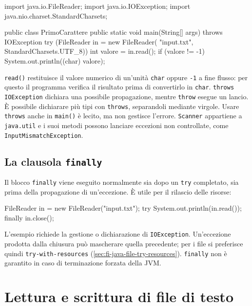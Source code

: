 \begin{unipdcode}[language=Java]
import java.io.FileReader;
import java.io.IOException;
import java.nio.charset.StandardCharsets;

public class PrimoCarattere {
    public static void main(String[] args) throws IOException {
        try (FileReader in = new FileReader(
                "input.txt", StandardCharsets.UTF_8)) {
            int valore = in.read();
            if (valore != -1) {
                System.out.println((char) valore);
            }
        }
    }
}
\end{unipdcode}

\texttt{read()} restituisce il valore numerico di un'unità
\texttt{char} oppure \texttt{-1} a fine flusso: per questo il
programma verifica il risultato prima di convertirlo in
\texttt{char}. \texttt{throws IOException} dichiara una possibile
propagazione, mentre \texttt{throw} esegue un lancio. È possibile dichiarare
più tipi con \texttt{throws}, separandoli mediante virgole.
Usare \texttt{throws} anche in \texttt{main()} è lecito,
ma non gestisce l'errore.
\texttt{Scanner} appartiene a \texttt{java.util} e i suoi metodi
possono lanciare eccezioni non controllate, come
\texttt{InputMismatchException}.

\subsection{La clausola \texttt{finally}}
\label{sec:fi-java-file-finally}

Il blocco \texttt{finally} viene eseguito normalmente sia dopo
un \texttt{try} completato, sia prima della propagazione di
un'eccezione. È utile per il rilascio delle risorse:

\begin{unipdcode}[language=Java]
FileReader in = new FileReader("input.txt");
try {
    System.out.println(in.read());
} finally {
    in.close();
}
\end{unipdcode}

L'esempio richiede la gestione o dichiarazione di
\texttt{IOException}. Un'eccezione prodotta dalla chiusura può
mascherare quella precedente; per i file si preferisce quindi
\texttt{try-with-resources} (\cref{sec:fi-java-file-try-resources}).
\texttt{finally} non è garantito in caso di terminazione forzata
della JVM.

\clearpage

\section{Lettura e scrittura di file di testo}
\label{sec:fi-java-file-testo}

